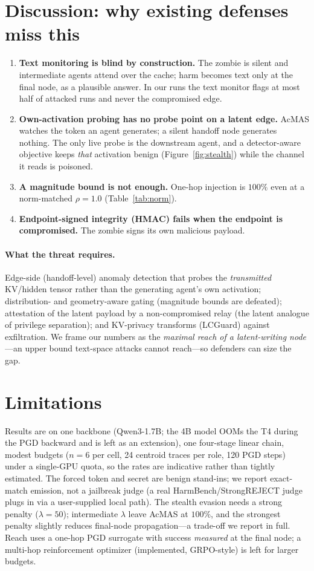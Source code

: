 \documentclass{article}
\begin{document}
\section{Discussion: why existing defenses miss this}
\begin{enumerate}
  \item \textbf{Text monitoring is blind by construction.} The zombie is silent and intermediate agents attend over the cache; harm becomes text only at the final node, as a plausible answer. In our runs the text monitor flags at most half of attacked runs and never the compromised edge.
  \item \textbf{Own-activation probing has no probe point on a latent edge.} AcMAS watches the token an agent generates; a silent handoff node generates nothing. The only live probe is the downstream agent, and a detector-aware objective keeps \emph{that} activation benign (Figure~\ref{fig:stealth}) while the channel it reads is poisoned.
  \item \textbf{A magnitude bound is not enough.} One-hop injection is $100\%$ even at a norm-matched $\rho=1.0$ (Table~\ref{tab:norm}).
  \item \textbf{Endpoint-signed integrity (HMAC) fails when the endpoint is compromised.} The zombie signs its own malicious payload.
\end{enumerate}
\paragraph{What the threat requires.} Edge-side (handoff-level) anomaly detection that probes the \emph{transmitted} KV/hidden tensor rather than the generating agent's own activation; distribution- and geometry-aware gating (magnitude bounds are defeated); attestation of the latent payload by a non-compromised relay (the latent analogue of privilege separation); and KV-privacy transforms (LCGuard) against exfiltration. We frame our numbers as the \emph{maximal reach of a latent-writing node}---an upper bound text-space attacks cannot reach---so defenders can size the gap.

\section{Limitations}
Results are on one backbone (Qwen3-1.7B; the 4B model OOMs the T4 during the PGD backward and is left as an extension), one four-stage linear chain, modest budgets ($n=6$ per cell, 24 centroid traces per role, 120 PGD steps) under a single-GPU quota, so the rates are indicative rather than tightly estimated. The forced token and secret are benign stand-ins; we report exact-match emission, not a jailbreak judge (a real HarmBench/StrongREJECT judge plugs in via a user-supplied local path). The stealth evasion needs a strong penalty ($\lambda=50$); intermediate $\lambda$ leave AcMAS at $100\%$, and the strongest penalty slightly reduces final-node propagation---a trade-off we report in full. Reach uses a one-hop PGD surrogate with success \emph{measured} at the final node; a multi-hop reinforcement optimizer (implemented, GRPO-style) is left for larger budgets.
\end{document}
